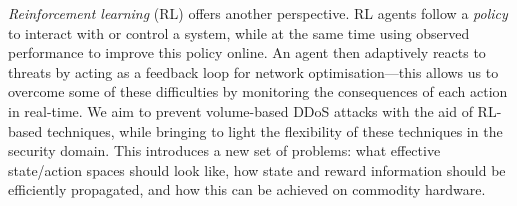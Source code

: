 \documentclass[10pt, times, conference, letterpaper]{IEEEtran}
\begin{document}
\emph{Reinforcement learning} (RL) offers another perspective.
RL agents follow a \emph{policy} to interact with or control a system, while at the same time using observed performance to improve this policy online.
An agent then adaptively reacts to threats by acting as a feedback loop for network optimisation---this allows us to overcome some of these difficulties by monitoring the consequences of each action in real-time.
We aim to prevent volume-based DDoS attacks with the aid of RL-based techniques, while bringing to light the flexibility of these techniques in the security domain.
This introduces a new set of problems: what effective state/action spaces should look like, how state and reward information should be efficiently propagated, and how this can be achieved on commodity hardware.
\end{document}
